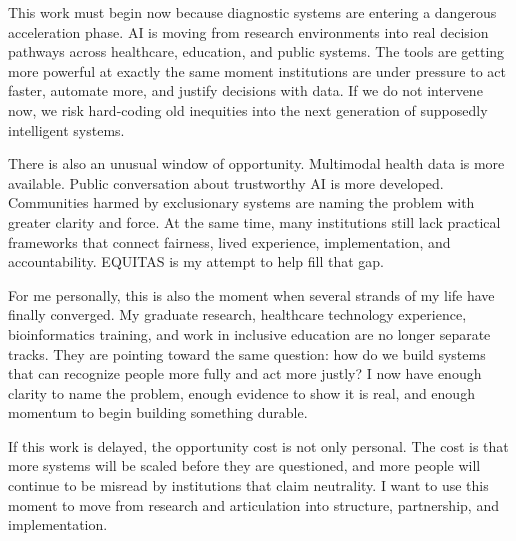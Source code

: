 \documentclass[11pt]{article}
\begin{document}
This work must begin now because diagnostic systems are entering a dangerous acceleration phase. AI is moving from research environments into real decision pathways across healthcare, education, and public systems. The tools are getting more powerful at exactly the same moment institutions are under pressure to act faster, automate more, and justify decisions with data. If we do not intervene now, we risk hard-coding old inequities into the next generation of supposedly intelligent systems.

There is also an unusual window of opportunity. Multimodal health data is more available. Public conversation about trustworthy AI is more developed. Communities harmed by exclusionary systems are naming the problem with greater clarity and force. At the same time, many institutions still lack practical frameworks that connect fairness, lived experience, implementation, and accountability. EQUITAS is my attempt to help fill that gap.

For me personally, this is also the moment when several strands of my life have finally converged. My graduate research, healthcare technology experience, bioinformatics training, and work in inclusive education are no longer separate tracks. They are pointing toward the same question: how do we build systems that can recognize people more fully and act more justly? I now have enough clarity to name the problem, enough evidence to show it is real, and enough momentum to begin building something durable.

If this work is delayed, the opportunity cost is not only personal. The cost is that more systems will be scaled before they are questioned, and more people will continue to be misread by institutions that claim neutrality. I want to use this moment to move from research and articulation into structure, partnership, and implementation.
\end{document}
